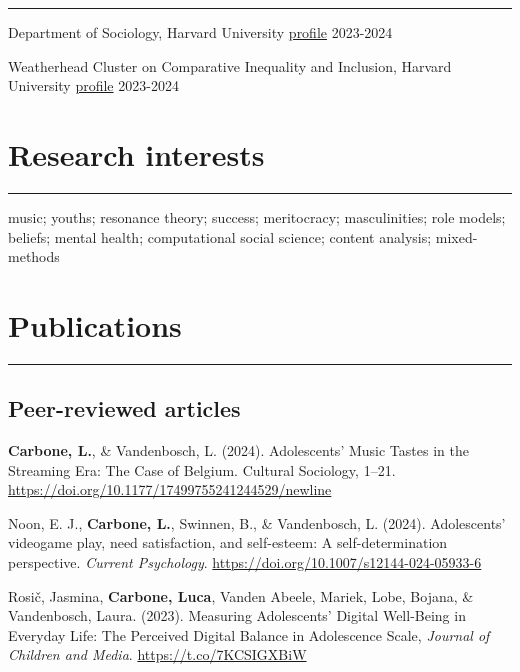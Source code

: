 \documentclass[12pt,]{article}
\begin{document}
\vspace{-10pt}
\rule{1\linewidth}{\linethickness}

Department of Sociology, Harvard University
\href{https://sociology.fas.harvard.edu/people/luca-carbone}{profile}
\hfill \begingroup\small 2023-2024\endgroup

Weatherhead Cluster on Comparative Inequality and Inclusion, Harvard
University
\href{https://inequality.wcfia.harvard.edu/people/luca-carbone-0}{profile}
\hfill \begingroup\small 2023-2024\endgroup

\hypertarget{research-interests}{%
\section{Research interests}\label{research-interests}}

\vspace{-10pt}
\rule{1\linewidth}{\linethickness}

music; youths; resonance theory; success; meritocracy; masculinities;
role models; beliefs; mental health; computational social science;
content analysis; mixed-methods

\hypertarget{publications}{%
\section{Publications}\label{publications}}

\vspace{-10pt}
\rule{1\linewidth}{\linethickness}

\hypertarget{peer-reviewed-articles}{%
\subsection{Peer-reviewed articles}\label{peer-reviewed-articles}}

\textbf{Carbone, L.}, \& Vandenbosch, L. (2024). Adolescents' Music
Tastes in the Streaming Era: The Case of Belgium. Cultural Sociology,
1--21. \url{https://doi.org/10.1177/17499755241244529/newline}

Noon, E. J., \textbf{Carbone, L.}, Swinnen, B., \& Vandenbosch, L.
(2024). Adolescents' videogame play, need satisfaction, and self-esteem:
A self-determination perspective. \emph{Current Psychology}.
\url{https://doi.org/10.1007/s12144-024-05933-6} \newline

Rosič, Jasmina, \textbf{Carbone, Luca}, Vanden Abeele, Mariek, Lobe,
Bojana, \& Vandenbosch, Laura. (2023). Measuring Adolescents' Digital
Well-Being in Everyday Life: The Perceived Digital Balance in
Adolescence Scale, \emph{Journal of Children and Media}.
\url{https://t.co/7KCSIGXBiW} \newline
\end{document}
